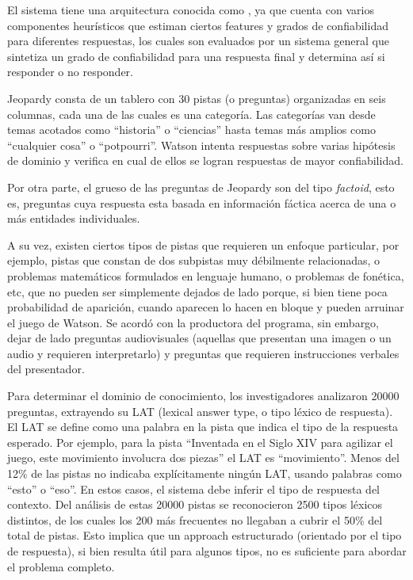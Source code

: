 \bigskip

El sistema tiene una arquitectura conocida como , ya que cuenta con varios componentes heurísticos que estiman
ciertos features y grados de confiabilidad para diferentes respuestas, los cuales son evaluados por un sistema general que sintetiza un grado
de confiabilidad para una respuesta final y determina así si responder o no responder. 

Jeopardy consta de un tablero con 30 pistas (o preguntas) organizadas
en seis columnas, cada una de las cuales es una categoría. Las
categorías van desde temas acotados como
{\textquotedblleft}historia{\textquotedblright} o
{\textquotedblleft}ciencias{\textquotedblright} hasta temas más
amplios como {\textquotedblleft}cualquier cosa{\textquotedblright} o
{\textquotedblleft}potpourri{\textquotedblright}. Watson intenta
respuestas sobre varias hipótesis de dominio y verifica en cual de
ellos se logran respuestas de mayor confiabilidad. 

Por otra parte, el grueso de las preguntas de Jeopardy son del tipo
\textit{factoid}, esto es, preguntas cuya respuesta esta basada en
información fáctica acerca de una o más entidades individuales.

A su vez, existen ciertos tipos de pistas que requieren un enfoque
particular, por ejemplo, pistas que constan de dos subpistas muy
débilmente relacionadas, o problemas matemáticos formulados en
lenguaje humano, o problemas de fonética, etc, que no pueden ser
simplemente dejados de lado porque, si bien tiene poca probabilidad de
aparición, cuando aparecen lo hacen en bloque y pueden arruinar el
juego de Watson. Se acordó con la productora del programa, sin
embargo, dejar de lado preguntas audiovisuales (aquellas que presentan
una imagen o un audio y requieren interpretarlo) y preguntas que
requieren instrucciones verbales del presentador.


\bigskip

Para determinar el dominio de conocimiento, los investigadores analizaron 20000 preguntas, extrayendo su LAT (lexical answer type, o tipo léxico de respuesta). El LAT se define como una palabra en la
pista que indica el tipo de la respuesta esperado. Por ejemplo, para la pista {\textquotedblleft}Inventada en el Siglo XIV para agilizar el juego, este movimiento involucra dos piezas{\textquotedblright} el LAT es {\textquotedblleft}movimiento{\textquotedblright}. Menos del 12\% de las pistas no indicaba explícitamente ningún LAT, usando palabras
como {\textquotedblleft}esto{\textquotedblright} o {\textquotedblleft}eso{\textquotedblright}. En estos casos, el sistema debe inferir el tipo de respuesta del contexto. Del análisis de estas
20000 pistas se reconocieron 2500 tipos léxicos distintos, de los cuales los 200 más frecuentes no llegaban a cubrir el 50\% del total de pistas. Esto implica que un approach estructurado (orientado por el
tipo de respuesta), si bien resulta útil para algunos tipos, no es suficiente para abordar el problema completo.

